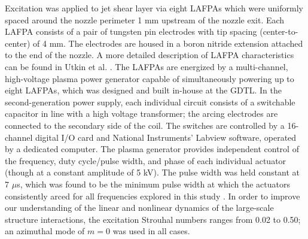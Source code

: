 \documentclass[english]{aiaa-tc}
\begin{document}
Excitation was applied to jet shear layer via eight LAFPAs which were uniformly spaced around the nozzle perimeter 1 mm upstream of the nozzle exit. Each LAFPA consists of a pair of tungsten pin electrodes with tip spacing (center-to-center) of 4 mm. The electrodes are housed in a boron nitride extension attached to the end of the nozzle. A more detailed description of LAFPA characteristics can be found in Utkin et al. \cite{uyg2007-1}. The LAFPAs are energized by a multi-channel, high-voltage plasma power generator capable of simultaneously powering up to eight LAFPAs, which was designed and built in-house at the GDTL. In the second-generation power supply, each individual circuit consists of a switchable capacitor in line with a high voltage transformer; the arcing electrodes are connected to the secondary side of the coil. The switches are controlled by a 16-channel digital I/O card and National Instruments' Labview software, operated by a dedicated computer. The plasma generator provides independent control of the frequency, duty cycle/pulse width, and phase of each individual actuator (though at a constant amplitude of 5 kV). The pulse width was held constant at 7 $\mu$s, which was found to be the minimum pulse width at which the actuators consistently arced for all frequencies explored in this study \cite{hkfs-2011}. In order to improve our understanding of the linear and nonlinear dynamics of the large-scale structure interactions, the excitation Strouhal numbers ranges from 0.02 to 0.50; an azimuthal mode of $m = 0$ was used in all cases.
\end{document}
